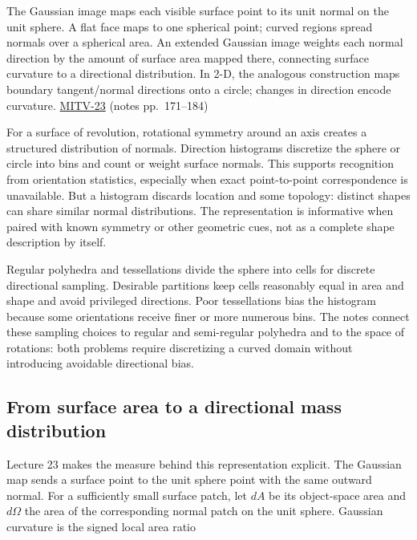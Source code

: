The Gaussian image maps each visible surface point to its unit normal on the unit sphere. A flat face maps to one spherical point; curved regions spread normals over a spherical area. An extended Gaussian image weights each normal direction by the amount of surface area mapped there, connecting surface curvature to a directional distribution. In 2-D, the analogous construction maps boundary tangent/normal directions onto a circle; changes in direction encode curvature. \hyperref[04-visual-computing-ii-ch036-mitv-23---gaussian-image-solids-of-revolution-direction-histograms-regular-polyhedra]{MITV-23} (notes pp.~171--184)

For a surface of revolution, rotational symmetry around an axis creates a structured distribution of normals. Direction histograms discretize the sphere or circle into bins and count or weight surface normals. This supports recognition from orientation statistics, especially when exact point-to-point correspondence is unavailable. But a histogram discards location and some topology: distinct shapes can share similar normal distributions. The representation is informative when paired with known symmetry or other geometric cues, not as a complete shape description by itself.

Regular polyhedra and tessellations divide the sphere into cells for discrete directional sampling. Desirable partitions keep cells reasonably equal in area and shape and avoid privileged directions. Poor tessellations bias the histogram because some orientations receive finer or more numerous bins. The notes connect these sampling choices to regular and semi-regular polyhedra and to the space of rotations: both problems require discretizing a curved domain without introducing avoidable directional bias.

\subsection{From surface area to a directional mass distribution}\label{04-visual-computing-ii-ch032-from-surface-area-to-a-directional-mass-distribution}

\hypertarget{04-visual-computing-ii-ch032-from-surface-area-to-a-directional-mass-distribution}{}

Lecture 23 makes the measure behind this representation explicit. The Gaussian map sends a surface point to the unit sphere point with the same outward normal. For a sufficiently small surface patch, let \(dA\) be its object-space area and \(d\Omega\) the area of the corresponding normal patch on the unit sphere. Gaussian curvature is the signed local area ratio

